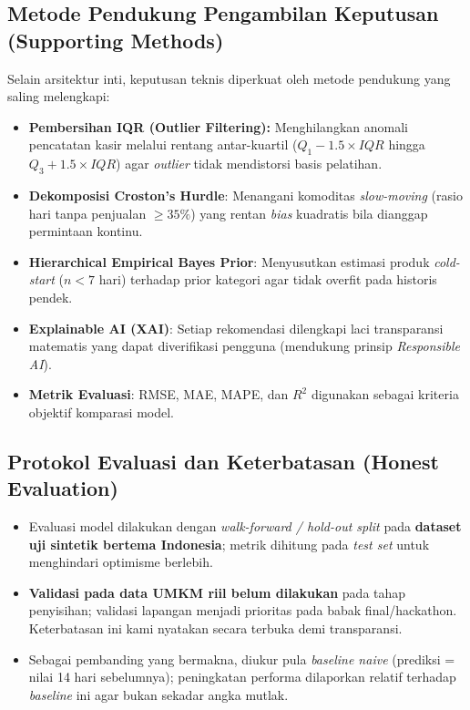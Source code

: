 \documentclass[12pt,a4paper]{article}
\begin{document}
\subsection{Metode Pendukung Pengambilan Keputusan (Supporting Methods)}
Selain arsitektur inti, keputusan teknis diperkuat oleh metode pendukung yang saling melengkapi:
\begin{itemize}
    \item \textbf{Pembersihan IQR (Outlier Filtering):} Menghilangkan anomali pencatatan kasir melalui rentang antar-kuartil ($Q_1 - 1.5 \times IQR$ hingga $Q_3 + 1.5 \times IQR$) agar \textit{outlier} tidak mendistorsi basis pelatihan.
    \item \textbf{Dekomposisi Croston's Hurdle}: Menangani komoditas \textit{slow-moving} (rasio hari tanpa penjualan $\ge 35\%$) yang rentan \textit{bias} kuadratis bila dianggap permintaan kontinu.
    \item \textbf{Hierarchical Empirical Bayes Prior}: Menyusutkan estimasi produk \textit{cold-start} ($n < 7$ hari) terhadap prior kategori agar tidak overfit pada historis pendek.
    \item \textbf{Explainable AI (XAI)}: Setiap rekomendasi dilengkapi laci transparansi matematis yang dapat diverifikasi pengguna (mendukung prinsip \textit{Responsible AI}).
    \item \textbf{Metrik Evaluasi}: RMSE, MAE, MAPE, dan $R^2$ digunakan sebagai kriteria objektif komparasi model.
\end{itemize}

\subsection{Protokol Evaluasi dan Keterbatasan (Honest Evaluation)}
\begin{itemize}
    \item Evaluasi model dilakukan dengan \textit{walk-forward / hold-out split} pada \textbf{dataset uji sintetik bertema Indonesia}; metrik dihitung pada \textit{test set} untuk menghindari optimisme berlebih.
    \item \textbf{Validasi pada data UMKM riil belum dilakukan} pada tahap penyisihan; validasi lapangan menjadi prioritas pada babak final/hackathon. Keterbatasan ini kami nyatakan secara terbuka demi transparansi.
    \item Sebagai pembanding yang bermakna, diukur pula \textit{baseline naive} (prediksi = nilai 14 hari sebelumnya); peningkatan performa dilaporkan relatif terhadap \textit{baseline} ini agar bukan sekadar angka mutlak.
\end{itemize}
\end{document}
